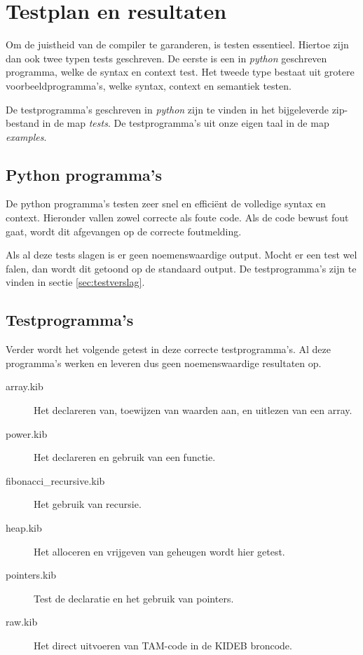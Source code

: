 \chapter{Testplan en resultaten} %
\label{cha:testplan_en_resultaten}
Om de juistheid van de compiler te garanderen, is testen essentieel. Hiertoe zijn dan ook twee typen tests geschreven. De eerste is een in \emph{python} geschreven programma, welke de syntax en context test. Het tweede type bestaat uit grotere voorbeeldprogramma's, welke syntax, context en semantiek testen.

De testprogramma's geschreven in \emph{python} zijn te vinden in het bijgeleverde zip-bestand in de map \emph{tests}. De testprogramma's uit onze eigen taal in de map \emph{examples}.

\section{Python programma's} %
\label{sec:python_programma_s}
De python programma's testen zeer snel en effici\"ent de volledige syntax en context. Hieronder vallen zowel correcte als foute code. Als de code bewust fout gaat, wordt dit afgevangen op de correcte foutmelding. 

Als al deze tests slagen is er geen noemenswaardige output. Mocht er een test wel falen, dan wordt dit getoond op de standaard output. De testprogramma's zijn te vinden in sectie \ref{sec:testverslag}.


\section{Testprogramma's} %
\label{sec:testprogramma_s}

Verder wordt het volgende getest in deze correcte testprogramma's. Al deze programma's werken en leveren dus geen noemenswaardige resultaten op.
\begin{description}
    \item[array.kib] Het declareren van, toewijzen van waarden aan, en uitlezen van een array.
    \item[power.kib] Het declareren en gebruik van een functie.
    \item[fibonacci\_recursive.kib] Het gebruik van recursie.
    \item[heap.kib] Het alloceren en vrijgeven van geheugen wordt hier getest. 
    \item[pointers.kib] Test de declaratie en het gebruik van pointers.
    \item[raw.kib] Het direct uitvoeren van TAM-code in de KIDEB broncode.
\end{description}

\clearpage